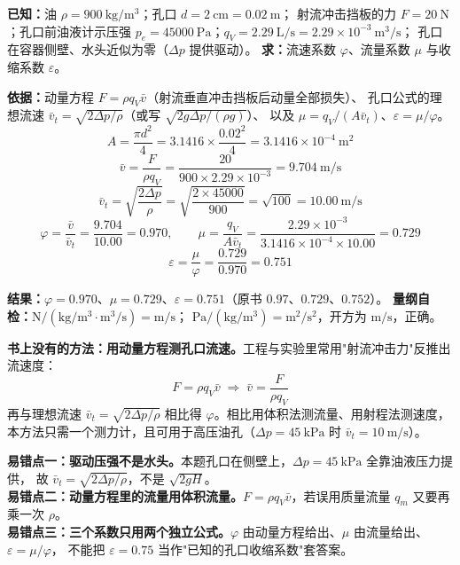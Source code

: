 \begin{jie}
\textbf{已知：}油 $\rho=900\ \mathrm{kg/m^3}$；孔口 $d=2\ \mathrm{cm}=0.02\ \mathrm{m}$；
射流冲击挡板的力 $F=20\ \mathrm{N}$；孔口前油液计示压强 $p_e=45000\ \mathrm{Pa}$；$q_V=2.29\ \mathrm{L/s}=2.29\times10^{-3}\ \mathrm{m^3/s}$；
孔口在容器侧壁、水头近似为零（$\Delta p$ 提供驱动）。
\textbf{求：}流速系数 $\varphi$、流量系数 $\mu$ 与收缩系数 $\varepsilon$。

\textbf{依据：}动量方程 $F=\rho q_V\bar v$（射流垂直冲击挡板后动量全部损失）、
孔口公式的理想流速 $\bar v_t=\sqrt{2\Delta p/\rho}$（或写 $\sqrt{2g\Delta p/(\rho g)}$）、
以及 $\mu=q_V/(A\bar v_t)$、$\varepsilon=\mu/\varphi$。
\[ A=\frac{\pi d^2}{4}=3.1416\times\frac{0.02^2}{4}=3.1416\times10^{-4}\ \mathrm{m^2} \]
\[ \bar v=\frac{F}{\rho q_V}=\frac{20}{900\times2.29\times10^{-3}}=9.704\ \mathrm{m/s} \]
\[ \bar v_t=\sqrt{\frac{2\Delta p}{\rho}}=\sqrt{\frac{2\times45000}{900}}=\sqrt{100}=10.00\ \mathrm{m/s} \]
\[ \varphi=\frac{\bar v}{\bar v_t}=\frac{9.704}{10.00}=0.970,\qquad
\mu=\frac{q_V}{A\bar v_t}=\frac{2.29\times10^{-3}}{3.1416\times10^{-4}\times10.00}=0.729 \]
\[ \varepsilon=\frac{\mu}{\varphi}=\frac{0.729}{0.970}=0.751 \]

\textbf{结果：}$\varphi=0.970$、$\mu=0.729$、$\varepsilon=0.751$（原书 $0.97$、$0.729$、$0.752$）。
\textbf{量纲自检：}$\mathrm{N/(kg/m^3\cdot m^3/s)}=\mathrm{m/s}$；
$\mathrm{Pa/(kg/m^3)}=\mathrm{m^2/s^2}$，开方为 $\mathrm{m/s}$，正确。
\end{jie}

\begin{tishi}
\textbf{书上没有的方法：用动量方程测孔口流速。}工程与实验里常用"射流冲击力"反推出流速度：
\[ F=\rho q_V\bar v\;\Longrightarrow\;\bar v=\frac{F}{\rho q_V} \]
再与理想流速 $\bar v_t=\sqrt{2\Delta p/\rho}$ 相比得 $\varphi$。相比用体积法测流量、用射程法测速度，
本方法只需一个测力计，且可用于高压油孔（$\Delta p=45\ \mathrm{kPa}$ 时 $\bar v_t=10\ \mathrm{m/s}$）。
\end{tishi}

\begin{yicuo}
\textbf{易错点一：驱动压强不是水头。}本题孔口在侧壁上，$\Delta p=45\ \mathrm{kPa}$ 全靠油液压力提供，
故 $\bar v_t=\sqrt{2\Delta p/\rho}$，不是 $\sqrt{2gH}$。\\
\textbf{易错点二：动量方程里的流量用体积流量。}$F=\rho q_V\bar v$，若误用质量流量 $q_m$ 又要再乘一次 $\rho$。\\
\textbf{易错点三：三个系数只用两个独立公式。}$\varphi$ 由动量方程给出、$\mu$ 由流量给出、$\varepsilon=\mu/\varphi$，
不能把 $\varepsilon=0.75$ 当作"已知的孔口收缩系数"套答案。
\end{yicuo}


